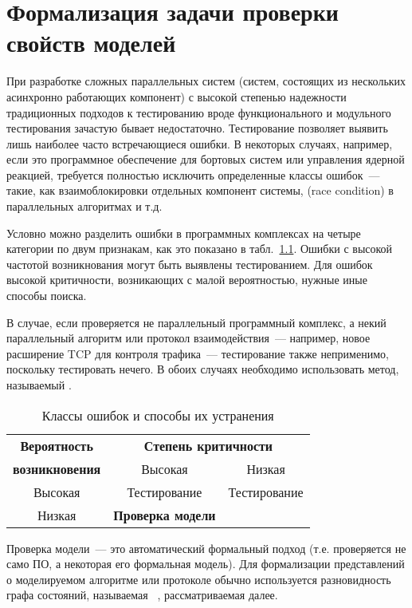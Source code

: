 \chapter{Формализация задачи проверки свойств моделей}
\label{cha:model-checking}

При разработке сложных параллельных систем (систем, состоящих из нескольких асинхронно
работающих компонент) с высокой степенью надежности традиционных подходов к тестированию
вроде функционального и модульного тестирования зачастую бывает недостаточно. Тестирование
позволяет выявить лишь наиболее часто встречающиеся ошибки. В некоторых случаях, например,
если это программное обеспечение для бортовых систем или управления ядерной реакцией,
требуется полностью исключить определенные классы ошибок~--- такие, как взаимоблокировки
отдельных компонент системы,  (race condition) в параллельных алгоритмах и
т.д.

Условно можно разделить ошибки в программных комплексах на четыре категории по двум признакам, как
это показано в табл.~\ref{tab:error-classes}. Ошибки с высокой частотой возникнования
могут быть выявлены тестированием. Для ошибок высокой критичности, возникающих с малой
вероятностью, нужные иные способы поиска.

В случае, если проверяется не параллельный программный комплекс, а некий параллельный
алгоритм или протокол взаимодействия~--- например, новое расширение TCP для контроля
трафика~--- тестирование также неприменимо, поскольку тестировать нечего. В обоих случаях
необходимо использовать метод, называемый .

\begin{table}[hb]
  \centering
  \caption{Классы ошибок и способы их устранения}
  \begin{tabular}{|c|c|c|} \hline
    \textbf{Вероятность} & \multicolumn{2}{|c|}{\bf Степень критичности} \\ \cline{2-3}
    \textbf{возникновения} & Высокая & Низкая \\ \hline
    Высокая & Тестирование & Тестирование \\  \hline
    Низкая  & \textbf{Проверка модели} &  \\  \hline
  \end{tabular}  
  \label{tab:error-classes}
\end{table}

Проверка модели~--- это автоматический формальный подход (т.е. проверяется не само ПО, а
некоторая его формальная модель). Для формализации представлений о моделируемом алгоритме
или протоколе обычно используется разновидность графа состояний, называемая ~\cite{Clarke}, рассматриваемая далее.

